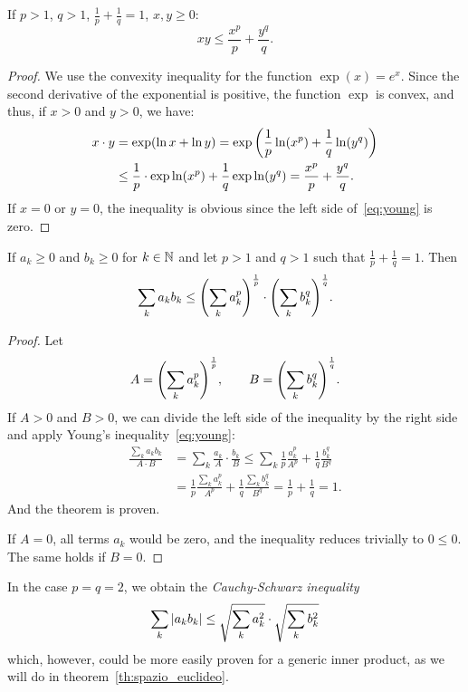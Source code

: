 \begin{theorem}%
\label{th:young}%
%
%
If $p>1$, $q>1$, $\frac{1}{p}+\frac{1}{q}=1$, $x,y\ge 0$:
\begin{equation}\label{eq:young}
  x y \le \frac{x^p}{p} + \frac{y^q}{q}.
\end{equation}
\end{theorem}
%
\begin{proof}
We use the convexity inequality for the function $\exp(x)=e^x$. 
Since the second derivative of the exponential is positive, the function $\exp$ 
is convex, and thus, if $x>0$ and $y>0$, we have:
\begin{align*}
 x\cdot y 
  &= \exp(\ln x + \ln y)
  = \exp{\left( \frac 1 p \ln (x^p) + \frac 1 q \ln (y^q) \right)}  \\
  &\le \frac 1 p \cdot \exp \ln (x^p) + \frac 1 q \exp \ln (y^q)
  = \frac{x^p}{p} + \frac{y^q}{q}.
\end{align*}
If $x=0$ or $y=0$, the inequality is obvious since the left side 
of~\eqref{eq:young} is zero.
\end{proof}

\begin{theorem}
If $a_k\ge 0$ and $b_k\ge 0$ for $k\in {\mathbb N}$
and let $p>1$ and $q>1$ such that $\frac 1 p + \frac 1 q = 1$.
Then 
\[
 \sum_k a_k b_k  \le {\left( \sum_k a_k^p \right)}^{1 \over p} \cdot {\left( \sum_k b_k^q \right)}^{1\over q}.
\]
\end{theorem}
\begin{proof}
Let 
\[
A = {\left( \sum_k a_k^p \right)}^{1 \over p}, \qquad 
B = {\left( \sum_k b_k^q \right)}^{1\over q}.
\]
If $A>0$ and $B>0$, we can divide the left side of the inequality 
by the right side and apply Young's inequality~\eqref{eq:young}:
\begin{align*}
  \frac{\sum_k a_k b_k}{A\cdot B} 
  & = \sum_k \frac{a_k}{A}\cdot \frac{b_k}{B} 
  \le \sum_k \frac 1 p \frac{a_k^p}{A^p} + \frac 1 q \frac{b_k^q}{B^q} \\
  &= \frac 1 p \frac{\sum_k a_k^p}{A^p} + \frac 1 q \frac{\sum_k b_k^q}{B^q}
  = \frac 1 p + \frac 1 q = 1.
\end{align*}
And the theorem is proven. 

If $A=0$, all terms $a_k$ would be zero, and the inequality 
reduces trivially to $0\le 0$. The same holds if $B=0$.  
\end{proof}

In the case $p=q=2$, we obtain the 
\emph{Cauchy-Schwarz inequality}%
%
%
%
%
%
\[
   \sum_k {\left|a_k b_k\right|} \le \sqrt{\sum_k a_k^2} \cdot \sqrt{\sum_k b_k^2}
\]
which, however, could be more easily proven 
for a generic inner product, as we will do 
in theorem~\ref{th:spazio_euclideo}.